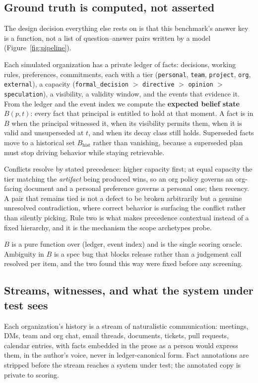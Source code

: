 \documentclass[11pt]{article}
\newcommand{\code}[1]{\texttt{\small #1}}
\begin{document}
\subsection{Ground truth is computed, not asserted}

The design decision everything else rests on is that this benchmark's answer key
is a function, not a list of question--answer pairs written by a model
(Figure~\ref{fig:pipeline}).

Each simulated organization has a private ledger of facts: decisions, working
rules, preferences, commitments, each with a tier (\code{personal}, \code{team},
\code{project}, \code{org}, \code{external}), a capacity
(\code{formal\_decision} $>$ \code{directive} $>$ \code{opinion} $>$
\code{speculation}), a visibility, a validity window, and the events that
evidence it. From the ledger and the event index we compute the \textbf{expected
belief state} $B(p,t)$: every fact that principal is entitled to hold at that
moment. A fact is in $B$ when the principal witnessed it, when its visibility
permits them, when it is valid and unsuperseded at $t$, and when its decay class
still holds. Superseded facts move to a historical set $B_{\mathrm{hist}}$ rather
than vanishing, because a superseded plan must stop driving behavior while
staying retrievable.

Conflicts resolve by stated precedence: higher capacity first; at equal capacity
the tier matching the \emph{artifact} being produced wins, so an org policy
governs an org-facing document and a personal preference governs a personal one;
then recency. A pair that remains tied is not a defect to be broken arbitrarily
but a genuine unresolved contradiction, where correct behavior is surfacing the
conflict rather than silently picking. Rule two is what makes precedence
contextual instead of a fixed hierarchy, and it is the mechanism the scope
archetypes probe.

$B$ is a pure function over (ledger, event index) and is the single scoring
oracle. Ambiguity in $B$ is a spec bug that blocks release rather than a judgement call
resolved per item, and the two found this way were fixed before any screening.

\subsection{Streams, witnesses, and what the system under test sees}

Each organization's history is a stream of naturalistic communication: meetings,
DMs, team and org chat, email threads, documents, tickets, pull requests,
calendar entries, with facts embedded in the prose as a person would express
them, in the author's voice, never in ledger-canonical form. Fact annotations are
stripped before the stream reaches a system under test; the annotated copy is
private to scoring.
\end{document}
